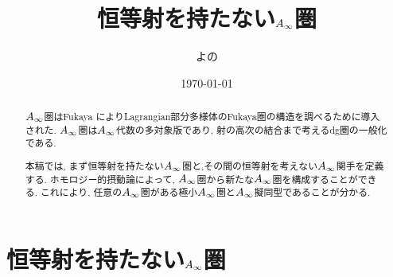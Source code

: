 \documentclass[uplatex, a4paper, 14Q, dvipdfmx]{jsarticle}
\title{恒等射を持たない\texorpdfstring{$A_{\infty}$}{Ainf}圏}
\author{よの}
\date{\today}
\begin{document}
\maketitle

\begin{abstract}
  $A_{\infty}$圏はFukaya \cite{Fuk93}\cite{Fuk96}によりLagrangian部分多様体のFukaya圏の構造を調べるために導入された. 
  $A_{\infty}$圏は$A_{\infty}$代数の多対象版であり, 射の高次の結合まで考えるdg圏の一般化である. 




  本稿では, まず恒等射を持たない$A_{\infty}$圏と,その間の恒等射を考えない$A_{\infty}$関手を定義する. 
  ホモロジー的摂動論によって, $A_{\infty}$圏から新たな$A_{\infty}$圏を構成することができる. 
  これにより, 任意の$A_{\infty}$圏がある極小$A_{\infty}$圏と$A_{\infty}$擬同型であることが分かる. 

\end{abstract}

\tableofcontents

\section{恒等射を持たない\texorpdfstring{$A_{\infty}$}{Ainf}圏} \label{section_non_unital_Ainf_cat}
\end{document}
